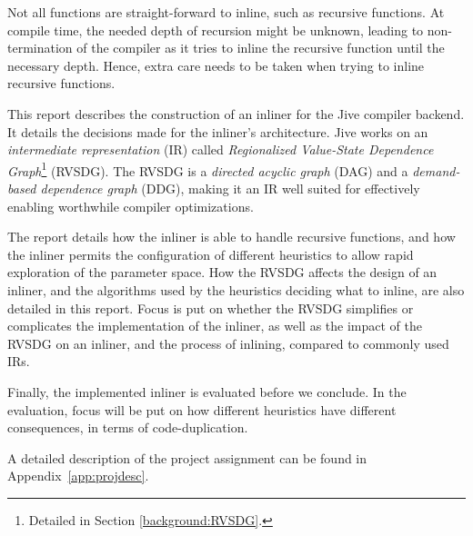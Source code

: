 Not all functions are straight-forward to inline, such as recursive functions.
At compile time, the needed depth of recursion might be unknown, leading to
non-termination of the compiler as it tries to inline the recursive function
until the necessary depth. Hence, extra care needs to be taken when trying to
inline recursive functions.

This report describes the construction of an inliner for the Jive compiler
backend. It details the decisions made for the inliner's architecture. Jive
works on an \textit{intermediate representation} (IR) called
\textit{Regionalized Value-State Dependence Graph}\footnote{Detailed in Section
\ref{background:RVSDG}.} (RVSDG). The RVSDG is a \textit{directed acyclic graph}
(DAG) and a \textit{demand-based dependence graph} (DDG), making it an IR well
suited for effectively enabling worthwhile compiler optimizations.


The report details how the inliner is able to handle recursive functions, and
how the inliner permits the configuration of different heuristics to allow rapid
exploration of the parameter space. How the RVSDG affects the design of an
inliner, and the algorithms used by the heuristics deciding what to inline, are
also detailed in this report. Focus is put on whether the RVSDG simplifies or
complicates the implementation of the inliner, as well as the impact of the
RVSDG on an inliner, and the process of inlining, compared to commonly used IRs.

Finally, the implemented inliner is evaluated before we conclude. In the
evaluation, focus will be put on how different heuristics have different
consequences, in terms of code-duplication.

A detailed description of the project assignment can be found in
Appendix~\ref{app:projdesc}.

